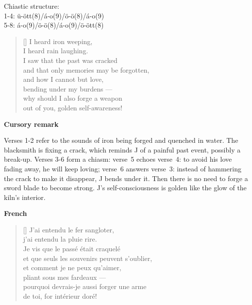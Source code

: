 \documentclass[a4paper,12pt,twoside,final]{book}
\begin{document}

\noindent Chiastic structure: \\
1-4: ü-ött(8)/á-o(9)/ö-ö(8)/á-o(9) \\
5-8: á-o(9)/ö-ö(8)/á-o(9)/ö-ött(8)

\newpage



\settowidth{\versewidth}{and that only a memory may be forgotten;}

\begin{verse}[\versewidth]
  I heard iron weeping, \\
  I heard rain laughing. \\
  I saw that the past was cracked \\
  and that only memories may be forgotten, \\
  and how I cannot but love, \\
  bending under my burdens --- \\
  why should I also forge a weapon \\
  out of you, golden self-awareness! \\
\end{verse}

\bigskip

\noindent \textbf{Cursory remark}

\medskip

Verses 1-2 refer to the sounds of iron being forged and quenched in
water. The blacksmith is fixing a crack, which reminds J of a painful
past event, possibly a break\hyp{}up. Verses 3-6 form a chiasm:
verse~5 echoes verse~4: to avoid his love fading away, he will keep
loving; verse~6 answers verse~3: instead of hammering the crack to
make it disappear, J bends under it. Then there is no need to forge a
sword blade to become strong. J's self\hyp{}consciousness is golden
like the glow of the kiln's interior.

\bigskip

\noindent \textbf{French}


\settowidth{\versewidth}{et que seuls les souvenirs peuvent s'oublier,}

\begin{verse}[\versewidth]
  J'ai entendu le fer sangloter, \\
  j'ai entendu la pluie rire. \\
  Je vis que le passé était craquelé \\
  et que seuls les souvenirs peuvent s'oublier, \\
  et comment je ne peux qu'aimer, \\
  pliant sous mes fardeaux --- \\
  pourquoi devrais-je aussi forger une arme \\
  de toi, for intérieur doré! \\
\end{verse}
\end{document}
